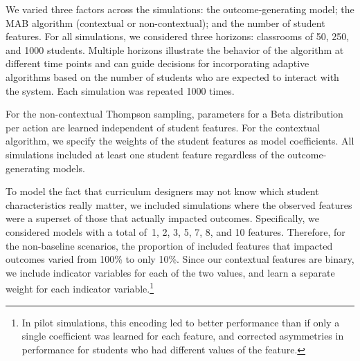 We varied three factors across the simulations: the outcome-generating model; the MAB algorithm (contextual or non-contextual);
and the number of student features. For all simulations, we considered three horizons: classrooms of 50, 250, and 1000 students. Multiple horizons illustrate the behavior of the algorithm at different time points and can guide decisions for incorporating adaptive algorithms based on the number of students who are expected to interact with the system. Each simulation was repeated 1000 times.

For the non-contextual Thompson sampling, parameters for a Beta distribution per action are learned independent of student features. For the contextual algorithm, we specify the weights of the student features as model coefficients. All simulations included at least one student feature regardless of the outcome-generating models.

To model the fact that curriculum designers may not know which student characteristics really matter, we included simulations where the observed features were a superset of those that actually impacted outcomes. Specifically, we considered models with a total of~1, 2, 3, 5, 7, 8, and 10 features. Therefore, for the non-baseline scenarios, the proportion of included features that impacted outcomes varied from 100\% to only 10\%. Since our contextual features are binary, we include indicator variables for each of the two values, and learn a separate weight for each indicator variable.\footnote{In pilot simulations, this encoding led to better performance than if only a single coefficient was learned for each feature, and corrected asymmetries in performance for students who had different values of the feature.} 



